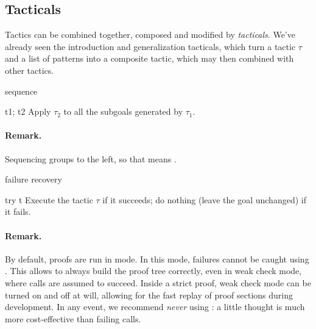 




















\subsection{Tacticals}
\label{subsec:tacticals}

Tactics can be combined together, composed and modified by
\emph{tacticals}. We've already seen the introduction and generalization
tacticals, which turn a tactic $\tau$ and a list of patterns into
a composite tactic, which may then combined with other tactics.

\begin{tactic}{sequence}
  \begin{tsyntax}[empty]{t1; t2}
  Apply $\tau_2$ to all the subgoals generated by $\tau_1$.

  \paragraph{Remark.} Sequencing groups to the left, so that
     means
    .
  \end{tsyntax}
\end{tactic}

\begin{tactic}{failure recovery}\label{tactic-try}
  \begin{tsyntax}[empty]{try t}
  Execute the tactic $\tau$ if it succeeds; do nothing (leave the
  goal unchanged) if it fails.

  \paragraph{Remark.}
  By default, \EasyCrypt proofs are run in  mode. In this
  mode,  failures cannot be caught using . This allows
  \EasyCrypt to always build the proof tree correctly, even in weak
  check mode, where  calls are assumed to succeed. Inside a
  strict proof, weak check mode can be turned on and off at will,
  allowing for the fast replay of proof sections during
  development. In any event, we recommend \emph{never} using : a little thought is much more cost-effective than failing
   calls.
  \end{tsyntax}
\end{tactic}

